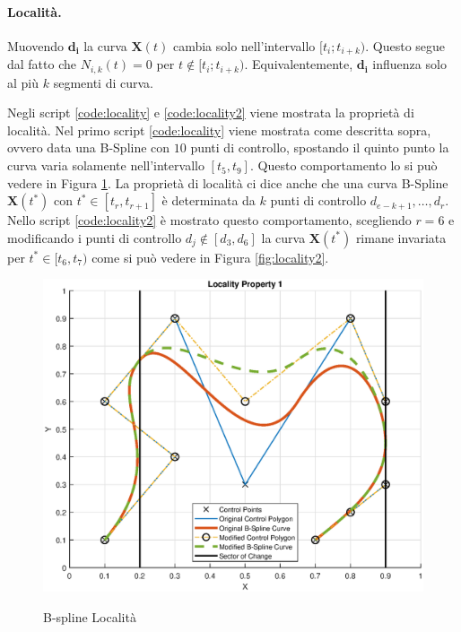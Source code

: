 \documentclass[a4paper, 12pt]{article}
\begin{document}
\paragraph{Località.}
Muovendo $\mathbf{d_i}$ la curva $\mathbf{X}(t)$ cambia solo nell’intervallo $[t_i; t_{i+k})$. Questo segue dal fatto che $N_{i, k}(t) = 0$ per $t \notin [t_i; t_{i+k})$. Equivalentemente, $\mathbf{d_i}$ influenza solo al più $k$ segmenti di curva.

Negli script \ref{code:locality} e \ref{code:locality2} viene mostrata la proprietà di località. Nel primo script \ref{code:locality} viene mostrata come descritta sopra, ovvero data una B-Spline con $10$ punti di controllo, spostando il quinto punto la curva  varia solamente nell'intervallo $[t_5,t_9]$. Questo comportamento lo si può vedere in Figura \ref{fig:locality}. La proprietà di località ci dice anche che una curva B-Spline $\mathbf{X}(t^*)$ con $t^* \in [t_r,t_{r+1}]$ è determinata da $k$ punti di controllo $d_{e-k+1},\dots,d_r$. Nello script \ref{code:locality2} è mostrato questo comportamento, scegliendo $r=6$ e modificando i punti di controllo $d_j \notin [d_3, d_6]$ la curva $\mathbf{X}(t^*)$ rimane invariata per $t^* \in [t_6,t_7)$ come si può vedere in Figura \ref{fig:locality2}.





\begin{figure}[h!]
	\centering
	\caption{B-spline Località}
	\includegraphics[scale=0.7]{locality_plot.eps}
	\label{fig:locality}
\end{figure}
\end{document}

